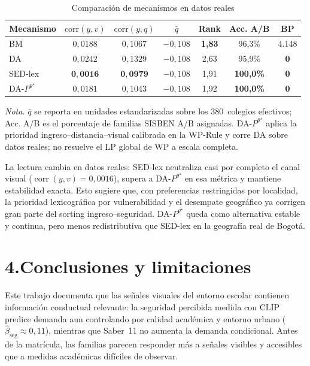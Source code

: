 \documentclass[12pt,a4paper]{article}
\begin{document}
\begin{table}[h!]
\centering
\caption{Comparación de mecanismos en datos reales}
\label{tab:wp_real}
\footnotesize
\begin{tabular}{lcccccc}
\toprule
Mecanismo & $\text{corr}(y,v)$ & $\text{corr}(y,q)$ & $\bar q$ & Rank & Acc. A/B & BP \\
\midrule
BM                  & $0{,}0188$ & $0{,}1067$ & $-0{,}108$ & \textbf{1{,}83} & 96{,}3\% & 4{.}148 \\
DA                  & $0{,}0242$ & $0{,}1329$ & $-0{,}108$ & 2{,}63 & 95{,}9\% & \textbf{0} \\
SED-lex             & $\mathbf{0{,}0016}$ & $\mathbf{0{,}0979}$ & $-0{,}108$ & 1{,}91 & \textbf{100{,}0\%} & \textbf{0} \\
DA-$P^{\theta^\star}$         & $0{,}0181$ & $0{,}1043$ & $-0{,}108$ & 1{,}92 & \textbf{100{,}0\%} & \textbf{0} \\
\bottomrule
\end{tabular}
\begin{minipage}{\linewidth}
\vspace{4pt}\footnotesize
\textit{Nota.} $\bar q$ se reporta en unidades estandarizadas sobre los
380~colegios efectivos; Acc. A/B es el porcentaje de familias SISBEN A/B asignadas.
DA-$P^{\theta^\star}$ aplica la prioridad
ingreso--distancia--visual calibrada en la WP-Rule y corre DA sobre datos reales;
no resuelve el LP global de WP a escala completa.
\end{minipage}
\end{table}

La lectura cambia en datos reales: SED-lex neutraliza casi por completo el canal
visual ($\operatorname{corr}(y,v)=0{,}0016$), supera a DA-$P^{\theta^\star}$ en
esa métrica y mantiene estabilidad exacta. Esto sugiere que, con preferencias
restringidas por localidad, la prioridad lexicográfica por vulnerabilidad y el
desempate geográfico ya corrigen gran parte del sorting ingreso--seguridad.
DA-$P^{\theta^\star}$ queda como alternativa estable y continua, pero menos
redistributiva que SED-lex en la geografía real de Bogotá.


\section*{4.\quad Conclusiones y limitaciones}

Este trabajo documenta que las señales visuales del entorno escolar contienen
información conductual relevante: la seguridad percibida medida con CLIP predice
demanda aun controlando por calidad académica y entorno urbano
($\hat\beta_{\text{seg}}\approx0{,}11$), mientras que Saber~11 no aumenta la
demanda condicional. Antes de la matrícula, las familias parecen responder más a
señales visibles y accesibles que a medidas académicas difíciles de observar.
\end{document}
